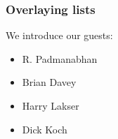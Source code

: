 \documentclass{beamer}
\begin{document}
\begin{frame}
\frametitle{Overlaying lists}

We introduce our guests:
\begin{itemize}
\item<1-> R. Padmanabhan
\item<2-> Brian Davey
\item<3-> Harry Lakser
\item<4-> Dick Koch
\end{itemize}
\end{frame}
\end{document}
